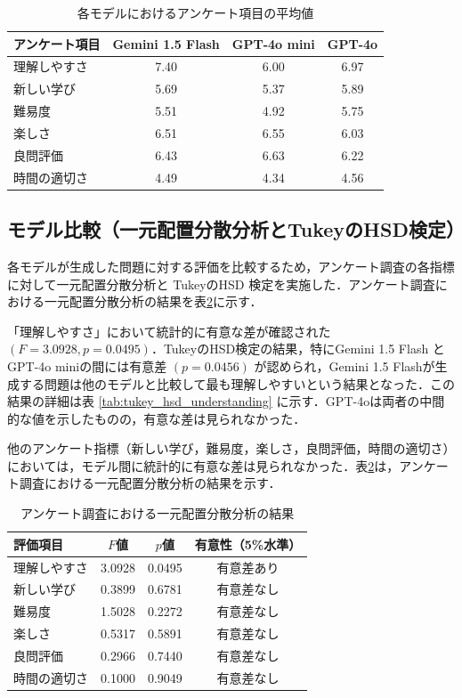 \documentclass[11pt]{jreport}
\begin{document}
\begin{table}[htbp]
  \centering
  \caption{各モデルにおけるアンケート項目の平均値}
  \label{tab:mean_values}
  \begin{tabular}{lccc}
    \toprule
    アンケート項目 & Gemini 1.5 Flash & GPT-4o mini & GPT-4o \\
    \midrule
    理解しやすさ & 7.40 & 6.00 & 6.97 \\
    新しい学び & 5.69 & 5.37 & 5.89 \\
    難易度 & 5.51 & 4.92 & 5.75 \\
    楽しさ & 6.51 & 6.55 & 6.03 \\
    良問評価 & 6.43 & 6.63 & 6.22 \\
    時間の適切さ & 4.49 & 4.34 & 4.56 \\
    \bottomrule
  \end{tabular}
\end{table}

\newpage
\subsection{モデル比較（一元配置分散分析とTukeyのHSD検定）}

各モデルが生成した問題に対する評価を比較するため，アンケート調査の各指標に対して一元配置分散分析と TukeyのHSD 検定を実施した．アンケート調査における一元配置分散分析の結果を表\ref{tab:anova_results}に示す．


「理解しやすさ」において統計的に有意な差が確認された $(F=3.0928, p=0.0495)$．TukeyのHSD検定の結果，特にGemini 1.5 Flash とGPT-4o miniの間には有意差 $(p=0.0456)$ が認められ，Gemini 1.5 Flashが生成する問題は他のモデルと比較して最も理解しやすいという結果となった．この結果の詳細は表 \ref{tab:tukey_hsd_understanding} に示す．GPT-4oは両者の中間的な値を示したものの，有意な差は見られなかった．

他のアンケート指標（新しい学び，難易度，楽しさ，良問評価，時間の適切さ）においては，モデル間に統計的に有意な差は見られなかった．表\ref{tab:anova_results}は，アンケート調査における一元配置分散分析の結果を示す．

\begin{table}[h]
  \centering
  \caption{アンケート調査における一元配置分散分析の結果}
  \label{tab:anova_results}
  \begin{tabular}{lccc}
    \hline
    評価項目 & $F$値 & $p$値 & 有意性（5\%水準） \\
    \hline
    理解しやすさ & 3.0928 & 0.0495 & 有意差あり \\
    新しい学び & 0.3899 & 0.6781 & 有意差なし \\
    難易度 & 1.5028 & 0.2272 & 有意差なし \\
    楽しさ & 0.5317 & 0.5891 & 有意差なし \\
    良問評価 & 0.2966 & 0.7440 & 有意差なし \\
    時間の適切さ & 0.1000 & 0.9049 & 有意差なし \\
    \hline
  \end{tabular}
\end{table}
\end{document}

